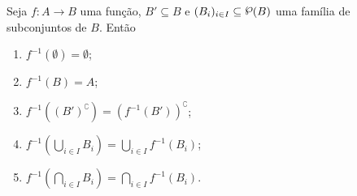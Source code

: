 \begin{proposition}
\label{prop:props.imag.inv}
	Seja $f: A \to B$ uma função, $B' \subseteq B$ e $(B_i)_{i \in I} \subseteq \p(B)$ uma família de subconjuntos de $B$. Então
	\begin{enumerate}
	\item $f^{-1}(\emptyset) = \emptyset$;
	\item $f^{-1}(B) = A$;
	\item $f^{-1}\left((B')^\complement\right) = (f^{-1}(B'))^\complement$;
	\item $f^{-1}\left(\displaystyle\bigcup_{i \in I} B_i\right) = \displaystyle\bigcup_{i \in I} f^{-1}(B_i)$;
	\item $f^{-1}\left(\displaystyle\bigcap_{i \in I} B_i\right) = \displaystyle\bigcap_{i \in I} f^{-1}(B_i)$.
	\end{enumerate}
\end{proposition}
